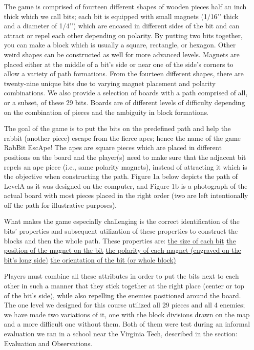 \documentclass{acm_proc_article-sp}
\begin{document}
The game is comprised of fourteen different shapes of wooden pieces half an inch thick which we call bits; each bit is equipped with small magnets (1/16’’ thick and a diameter of 1/4’’) which are encased in different sides of the bit and can attract or repel each other depending on polarity. By putting two bits together, you can make a block which is usually a square, rectangle, or hexagon. Other weird shapes can be constructed as well for more advanced levels. Magnets are placed either at the middle of a bit’s side or near one of the side’s corners to allow a variety of path formations. From the fourteen different shapes, there are twenty-nine unique bits due to varying magnet placement and polarity combinations. We also provide a selection of boards with a path comprised of all, or a subset, of these 29 bits. Boards are of different levels of difficulty depending on the combination of pieces and the ambiguity in block formations.

The goal of the game is to put the bits on the predefined path and help the rabbit (another piece) escape from the fierce apes; hence the name of the game RabBit EscApe! The apes are square pieces which are placed in different positions on the board and the player(s) need to make sure that the adjacent bit repels an ape piece (i.e., same polarity magnets), instead of attracting it which is the objective when constructing the path. Figure 1a below depicts the path of LevelA as it was designed on the computer, and Figure 1b is a photograph of the actual board with most pieces placed in the right order (two are left intentionally off the path for illustrative purposes).

What makes the game especially challenging is the correct identification of the bits’ properties and subsequent utilization of these properties to construct the blocks and then the whole path. These properties are:
\ul{the size of each bit}
\ul{the position of the magnet on the bit}
\ul{the polarity of each magnet (engraved on the bit’s long side)}
\ul{the orientation of the bit (or whole block)}

Players must combine all these attributes in order to put the bits next to each other in such a manner that they stick together at the right place (center or top of the bit’s side), while also repelling the enemies positioned around the board. The one level we designed for this course utilized all 29 pieces and all 4 enemies; we have made two variations of it, one with the block divisions drawn on the map and a more difficult one without them. Both of them were test during an informal evaluation we ran in a school near the Virginia Tech, described in the section: Evaluation and Observations.
\end{document}
